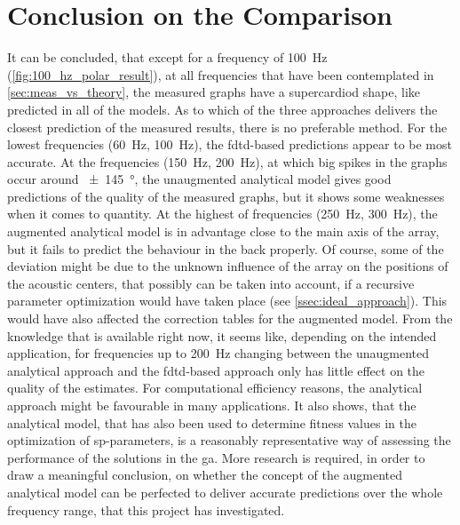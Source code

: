 \section{Conclusion on the Comparison}\label{meas_vs_theory_conclusion}
It can be concluded, that except for a frequency of \SI{100}{\hertz} (\autoref{fig:100_hz_polar_result}), at all frequencies that have been contemplated in \autoref{sec:meas_vs_theory}, the measured graphs have a supercardiod shape, like predicted in all of the models. As to which of the three approaches delivers the closest prediction of the measured results, there is no preferable method. For the lowest frequencies (\SI{60}{\hertz}, \SI{100}{\hertz}), the \gls{fdtd}-based predictions appear to be most accurate. At the frequencies (\SI{150}{\hertz}, \SI{200}{\hertz}), at which big spikes in the graphs occur around \SI{\pm 145}{\degree}, the unaugmented analytical model gives good predictions of the quality of the measured graphs, but it shows some weaknesses when it comes to quantity. At the highest of frequencies (\SI{250}{\hertz}, \SI{300}{\hertz}), the augmented analytical model is in advantage close to the main axis of the array, but it fails to predict the behaviour in the back properly. Of course, some of the deviation might be due to the unknown influence of the array on the positions of the acoustic centers, that possibly can be taken into account, if a recursive parameter optimization would have taken place (see \autoref{ssec:ideal_approach}). This would have also affected the correction tables for the augmented model. From the knowledge that is available right now, it seems like, depending on the intended application, for frequencies up to \SI{200}{\hertz} changing between the unaugmented analytical approach and the \gls{fdtd}-based approach only has little effect on the quality of the estimates. For computational efficiency reasons, the analytical approach might be favourable in many applications. It also shows, that the analytical model, that has also been used to determine fitness values in the optimization of \gls{sp}-parameters, is a reasonably representative way of assessing the performance of the solutions in the \gls{ga}. More research is required, in order to draw a meaningful conclusion, on whether the concept of the augmented analytical model can be perfected to deliver accurate predictions over the whole frequency range, that this project has investigated.